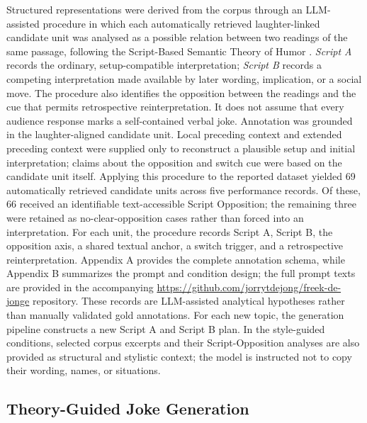 \documentclass[11pt]{article}
\begin{document}
Structured representations were derived from the corpus through an LLM-assisted procedure in which each automatically retrieved laughter-linked candidate unit was analysed as a possible relation between two readings of the same passage, following the Script-Based Semantic Theory of Humor \citep{raskin1985}. \emph{Script A} records the ordinary, setup-compatible interpretation; \emph{Script B} records a competing interpretation made available by later wording, implication, or a social move. The procedure also identifies the opposition between the readings and the cue that permits retrospective reinterpretation. It does not assume that every audience response marks a self-contained verbal joke. Annotation was grounded in the laughter-aligned candidate unit. Local preceding context and extended preceding context were supplied only to reconstruct a plausible setup and initial interpretation; claims about the opposition and switch cue were based on the candidate unit itself. Applying this procedure to the reported dataset yielded 69 automatically retrieved candidate units across five performance records. Of these, 66 received an identifiable text-accessible Script Opposition; the remaining three were retained as no-clear-opposition cases rather than forced into an interpretation. For each unit, the procedure records Script A, Script B, the opposition axis, a shared textual anchor, a switch trigger, and a retrospective reinterpretation. Appendix A provides the complete annotation schema, while Appendix B summarizes the prompt and condition design; the full prompt texts are provided in the accompanying \url{https://github.com/jorrytdejong/freek-de-jonge} repository. These records are LLM-assisted analytical hypotheses rather than manually validated gold annotations. For each new topic, the generation pipeline constructs a new Script A and Script B plan. In the style-guided conditions, selected corpus excerpts and their Script-Opposition analyses are also provided as structural and stylistic context; the model is instructed not to copy their wording, names, or situations.

\subsection{Theory-Guided Joke Generation}\label{theory-guided-joke-generation}
\end{document}

